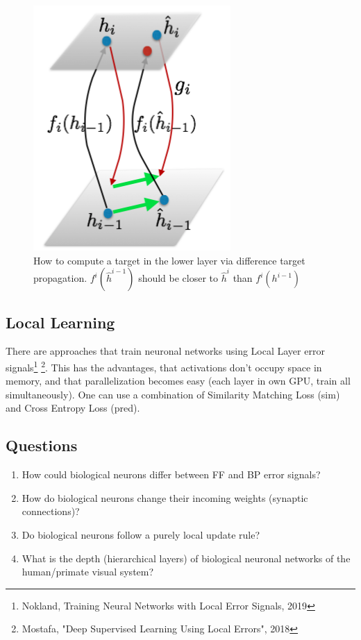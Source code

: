\documentclass[main]{subfiles}
\begin{document}
\begin{figure}[H]
	\centering
	\includegraphics[width=0.45\linewidth]{02_TrainingMethodsForDeepANNs/figures/dtp.png}
	\caption{How to compute a target in the lower layer via difference target propagation. $f^i( \hat{h}^{i-1})$ should be closer to $\hat{h}^i$ than $f^i(h^{i-1})$}
	\label{fig:targetprop}
\end{figure}



\subsection{Local Learning}
There are approaches that train neuronal networks using Local Layer error signals\footnote{Nokland, Training Neural Networks with Local Error Signals, 2019} \footnote{Mostafa, "Deep Supervised Learning Using Local Errors", 2018}. This has the advantages, that activations don't occupy space in memory, and that parallelization becomes easy (each layer in own GPU, train all simultaneously). One can use a combination of Similarity Matching Loss (sim) and Cross Entropy Loss (pred).

\subsection{Questions}
\begin{enumerate}
    \item How could biological neurons differ between FF and BP error signals?
    \item How do biological neurons change their incoming weights (synaptic connections)?
    \item Do biological neurons follow a purely local update rule?
    \item What is the depth (hierarchical layers) of biological neuronal networks of the human/primate visual system?
\end{enumerate}
\end{document}

